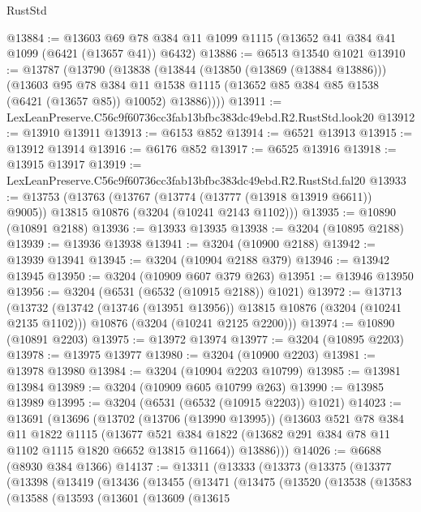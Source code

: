 \begin{lexlean}{RustStd}
\begin{coremodule}
@13884 := @13603 @69 @78 @384 @11 @1099 @1115 (@13652 @41 @384 @41 @1099 (@6421 (@13657 @41)) @6432)
@13886 := @6513 @13540 @1021
@13910 := @13787
    (@13790
      (@13838
        (@13844
          (@13850 (@13869 (@13884 @13886)))
          (@13603
            @95
            @78
            @384
            @11
            @1538
            @1115
            (@13652 @85 @384 @85 @1538 (@6421 (@13657 @85)) @10052)
            @13886))))
@13911 := LexLeanPreserve.C56c9f60736cc3fab13bfbc383dc49ebd.R2.RustStd.look20
@13912 := @13910 @13911
@13913 := @6153 @852
@13914 := @6521 @13913
@13915 := @13912 @13914
@13916 := @6176 @852
@13917 := @6525 @13916
@13918 := @13915 @13917
@13919 := LexLeanPreserve.C56c9f60736cc3fab13bfbc383dc49ebd.R2.RustStd.fal20
@13933 := @13753
    (@13763
      (@13767 (@13774 (@13777 (@13918 @13919 @6611)) @9005))
      @13815
      @10876
      (@3204 (@10241 @2143 @1102)))
@13935 := @10890 (@10891 @2188)
@13936 := @13933 @13935
@13938 := @3204 (@10895 @2188)
@13939 := @13936 @13938
@13941 := @3204 (@10900 @2188)
@13942 := @13939 @13941
@13945 := @3204 (@10904 @2188 @379)
@13946 := @13942 @13945
@13950 := @3204 (@10909 @607 @379 @263)
@13951 := @13946 @13950
@13956 := @3204 (@6531 (@6532 (@10915 @2188)) @1021)
@13972 := @13713
    (@13732
      (@13742 (@13746 (@13951 @13956)) @13815 @10876 (@3204 (@10241 @2135 @1102)))
      @10876
      (@3204 (@10241 @2125 @2200)))
@13974 := @10890 (@10891 @2203)
@13975 := @13972 @13974
@13977 := @3204 (@10895 @2203)
@13978 := @13975 @13977
@13980 := @3204 (@10900 @2203)
@13981 := @13978 @13980
@13984 := @3204 (@10904 @2203 @10799)
@13985 := @13981 @13984
@13989 := @3204 (@10909 @605 @10799 @263)
@13990 := @13985 @13989
@13995 := @3204 (@6531 (@6532 (@10915 @2203)) @1021)
@14023 := @13691
    (@13696
      (@13702
        (@13706 (@13990 @13995))
        (@13603
          @521
          @78
          @384
          @11
          @1822
          @1115
          (@13677 @521 @384 @1822 (@13682 @291 @384 @78 @11 @1102 @1115 @1820 @6652 @13815 @11664))
          @13886)))
@14026 := @6688 (@8930 @384 @1366)
@14137 := @13311
    (@13333
      (@13373
        (@13375
          (@13377
            (@13398
              (@13419
                (@13436
                  (@13455
                    (@13471
                      (@13475
                        (@13520
                          (@13538
                            (@13583
                              (@13588
                                (@13593
                                  (@13601
                                    (@13609
                                      (@13615

\end{coremodule}
\end{lexlean}
